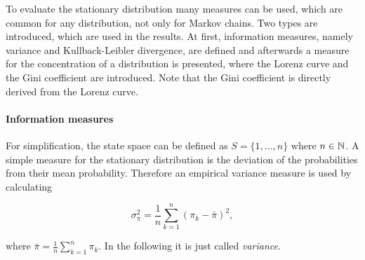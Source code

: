 To evaluate the stationary distribution many measures can be used, which are common for any distribution, not only for Markov chains. Two types are introduced, which are used in the results. At first, information measures, namely variance and Kullback-Leibler divergence, are defined and afterwards a measure for the concentration of a distribution is presented, where the Lorenz curve and the Gini coefficient are introduced. Note that the Gini coefficient is directly derived from the Lorenz curve.

\paragraph{Information measures}

For simplification, the state space can be defined as $S = \{1, ..., n\}$ where $n \in\mathbb{N}$. A simple measure for the stationary distribution is the deviation of the probabilities from their mean probability. Therefore an empirical variance measure is used by calculating

\begin{equation}
\label{eq:variance-estimate}
\sigma^2_\pi = \frac{1}{n} \sum_{k=1}^n (\pi_k - \bar\pi)^2,
\end{equation}

where $\bar\pi = \frac{1}{n} \sum_{k=1}^n \pi_k$. In the following it is just called \emph{variance}.






